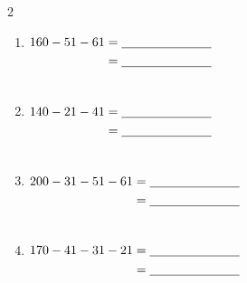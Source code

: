 \documentclass{article}
\begin{document}
\begin{multicols}{2}
\begin{enumerate}[label=\textbf{\arabic*.}, itemsep=1.8em, leftmargin=2em]
  \item $\begin{aligned}[t] 160 - 51 - 61 &= \underline{\hspace{2.5cm}} \\ &= \underline{\hspace{2.5cm}} \\ &\vphantom{70 - 1 - 1 = 68}\end{aligned}$
  \item $\begin{aligned}[t] 140 - 21 - 41 &= \underline{\hspace{2.5cm}} \\ &= \underline{\hspace{2.5cm}} \\ &\vphantom{70 - 1 - 1 = 68}\end{aligned}$
  \item $\begin{aligned}[t] 200 - 31 - 51 - 61 &= \underline{\hspace{2.5cm}} \\ &= \underline{\hspace{2.5cm}} \\ &\vphantom{70 - 1 - 1 = 68}\end{aligned}$
  \item $\begin{aligned}[t] 170 - 41 - 31 - 21 &= \underline{\hspace{2.5cm}} \\ &= \underline{\hspace{2.5cm}} \\ &\vphantom{70 - 1 - 1 = 68}\end{aligned}$
\end{enumerate}
\end{multicols}
\end{document}
